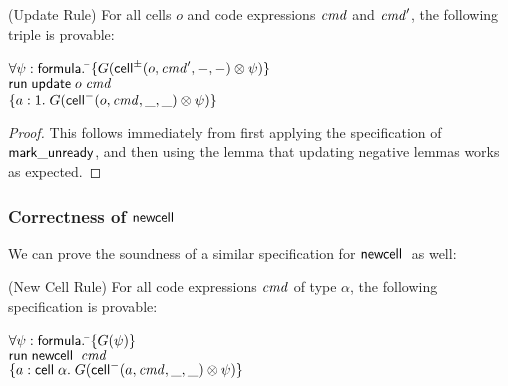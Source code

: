 \begin{lemma}{(Update Rule)}
For all cells $o$ and code expressions $\mathit{cmd}$ and $\mathit{cmd}'$, the following
triple is provable: 

\begin{tabbing}
$\forall \psi:\mathsf{formula}.\; $\=$\{{G(\mathsf{cell}^{\pm}({o}, {\mathit{cmd}'}, {-}, {-}) \otimes \psi)}\}$ \\
                           \>$\mathsf{run}\;{\mathsf{update}\;o\;\mathit{cmd}}$ \\
                           \>$\{{a:1.\; G(\mathsf{cell}^{-}({o}, {\mathit{cmd}}, {\_}, {\_}) \otimes \psi)}\}$
\end{tabbing}
\end{lemma}

\begin{proof}
This follows immediately from first applying the specification of $\mathsf{mark\_unready}$, 
and then using the lemma that updating negative lemmas works as expected. 
\end{proof}


\subsubsection{Correctness of $\mathsf{newcell}\;$}

We can prove the soundness of a similar specification for $\mathsf{newcell}\;$ as
well:

\begin{prop}{(New Cell Rule)}
For all code expressions $\mathit{cmd}$ of type $\alpha$, the following specification is provable: 
\begin{tabbing}
$\forall \psi:\mathsf{formula}.\; $\=$\{{G(\psi)}\}$ \\
                           \>$\mathsf{run}\;{\mathsf{newcell}\;\;\mathit{cmd}}$ \\
                           \>$\{{a:\mathsf{cell}\;{\alpha}.\; G(\mathsf{cell}^{-}({a}, {\mathit{cmd}}, {\_}, {\_}) \otimes \psi)}\}$
\end{tabbing}
\end{prop}

